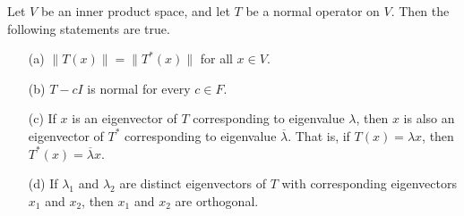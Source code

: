 \begin{theorem}\label{Theorem 6.15}
   Let \( V  \) be an inner product space, and let \( T  \) be a normal operator on \( V  \). Then the following statements are true. 
   \begin{enumerate}
       \item[(a)] \( \|T(x)\| = \|T^{*}(x)\|  \) for all \( x \in V  \).
        \item[(b)] \( T - cI  \) is normal for every \( c \in F  \).
        \item[(c)] If \( x  \) is an eigenvector of \( T  \) corresponding to eigenvalue \( \lambda  \), then \( x  \) is also an eigenvector of \( T^{*} \) corresponding to eigenvalue \( \overline{\lambda} \). That is, if \( T(x) = \lambda x  \), then \( T^{*}(x) = \overline{\lambda } x  \).
        \item[(d)] If \( {\lambda}_{1} \) and \( {\lambda}_{2} \) are distinct eigenvectors of \( T  \) with corresponding eigenvectors \( {x}_{1} \) and \( {x}_{2} \), then \( {x}_{1} \) and \( {x}_{2} \) are orthogonal.
   \end{enumerate}
\end{theorem}

